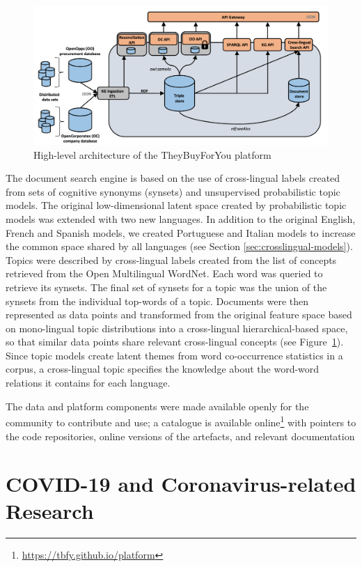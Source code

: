 \begin{figure}[ht]
    \centering
    \includegraphics[width=0.7\linewidth]{tbfy-architecture.png}
    \caption{High-level architecture of the TheyBuyForYou platform}
    \label{fig:tbfy-architecture}
\end{figure}

The document search engine is based on the use of cross-lingual labels created from sets of cognitive synonyms (synsets) and unsupervised probabilistic topic models. The original low-dimensional latent space created by probabilistic topic models \cite{Badenes-Olmedo2019a} was extended with two new languages. In addition to the original English, French and Spanish models, we created Portuguese and Italian models to increase the common space shared by all languages (see Section \ref{sec:crosslingual-models}). Topics were described by cross-lingual labels created from the list of concepts retrieved from the Open Multilingual WordNet. Each word was queried to retrieve its synsets. The final set of synsets for a topic was the union of the synsets from the individual top-words of a topic. Documents were then represented as data points and transformed from the original feature space based on mono-lingual topic distributions into a cross-lingual hierarchical-based space, so that similar data points share relevant cross-lingual concepts (see Figure~\ref{fig:tbfy-architecture}). Since topic models create latent themes from word co-occurrence statistics in a corpus, a cross-lingual topic specifies the knowledge about the word-word relations it contains for each language. 

The data and platform components were made available openly for the community to contribute and use; a catalogue is available online\footnote{\url{https://tbfy.github.io/platform}} with pointers to the code repositories, online versions of the artefacts, and relevant documentation


\section{COVID-19 and Coronavirus-related Research}
\label{sec:drugs4covid}


